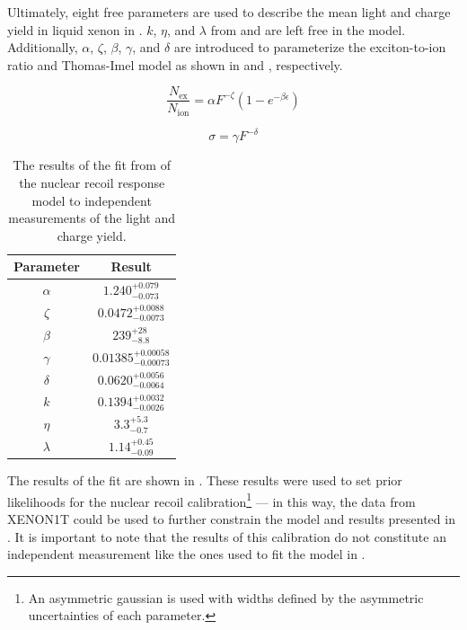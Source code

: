 Ultimately, eight free parameters are used to describe the mean light and charge yield in liquid xenon in .  $k$, $\eta$, and $\lambda$ from  and  are left free in the model.  Additionally, $\alpha$, $\zeta$, $\beta$, $\gamma$, and $\delta$ are introduced to parameterize the exciton-to-ion ratio and Thomas-Imel model as shown in  and , respectively.


\begin{equation}
        \label{eqn:xe1t_ex_ion_parameterization}
        \frac{N_{\textrm{ex}}}{N_{\textrm{ion}}} = \alpha F^{-\zeta} (1 - e^{-\beta \epsilon})
\end{equation}

\begin{equation}
        \label{eqn:ti_model_parameterization}
        \sigma = \gamma F^{-\delta}
\end{equation}

\begin{table}[t]
\centering
\def\arraystretch{1.3}
\begin{tabular}{|c|c|}
\hline
Parameter & Result \\
\hline
$\alpha$ & $1.240^{+0.079}_{-0.073}$ \\ \hline
$\zeta$ & $0.0472^{+0.0088}_{-0.0073}$ \\ \hline
$\beta$ & $239^{+28}_{-8.8}$ \\ \hline
$\gamma$ & $0.01385^{+0.00058}_{-0.00073}$ \\ \hline
$\delta$ & $0.0620^{+0.0056}_{-0.0064}$ \\ \hline
$k$ & $0.1394^{+0.0032}_{-0.0026}$ \\ \hline
$\eta$ & $3.3^{+5.3}_{-0.7}$ \\ \hline
$\lambda$ & $1.14^{+0.45}_{-0.09}$ \\ \hline
\end{tabular}
\caption{The results of the fit from  of the nuclear recoil response model to independent measurements of the light and charge yield.}
\label{tab:xe1t_nest_results}
\end{table}

The results of the fit are shown in .  These results were used to set prior likelihoods for the nuclear recoil calibration\footnote{An asymmetric gaussian is used with widths defined by the asymmetric uncertainties of each parameter.} --- in this way, the data from XENON1T could be used to further constrain the model and results presented in .  It is important to note that the results of this calibration do not constitute an independent measurement like the ones used to fit the model in . 


